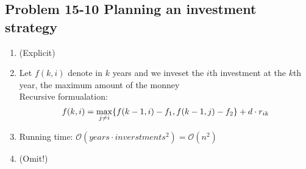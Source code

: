\subsection*{Problem 15-10 Planning an investment strategy}
\begin{enumerate}
	\item	(Explicit)
	\item	Let $f(k, i)$ denote in $k$ years and we inveset the $i$th investment at the $k$th year, the maximum amount of the monney \\
		Recursive formualation:
		\begin{equation} \notag
			f(k, i) = \max_{j \neq i} \{f(k - 1, i) - f_1, f(k - 1, j) - f_2\} + d \cdot r_{ik}
		\end{equation}
	\item	Running time: $\mathcal{O}(years \cdot inverstments^2) = \mathcal{O}(n^2)$
	\item	(Omit!)
\end{enumerate}


